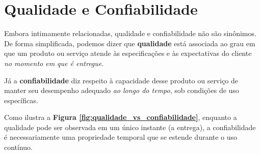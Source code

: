 \documentclass[12pt,a4paper,twoside]{report}
\begin{document}
\section{Qualidade e Confiabilidade}

Embora intimamente relacionadas, qualidade e confiabilidade não são sinônimos.
De forma simplificada, podemos dizer que \textbf{qualidade} está associada ao
grau em que um produto ou serviço atende às especificações e às expectativas
do cliente \emph{no momento em que é entregue}. 

Já a \textbf{confiabilidade}
diz respeito à capacidade desse produto ou serviço de manter seu desempenho
adequado \emph{ao longo do tempo}, sob condições de uso específicas.

Como ilustra a \textbf{Figura \ref{fig:qualidade_vs_confiabilidade}}, enquanto a qualidade pode ser observada em um único instante (a entrega), a confiabilidade é necessariamente uma propriedade temporal que se estende durante o uso contínuo.
\end{document}

